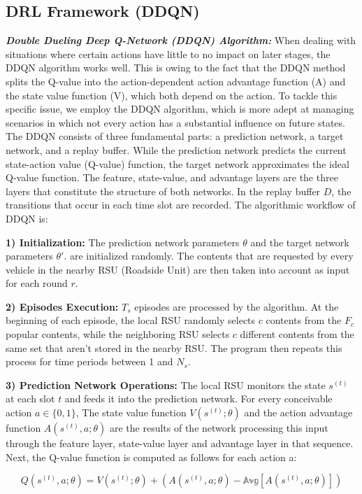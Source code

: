 \documentclass[journal]{IEEEtran}
\begin{document}
\subsection{DRL Framework (DDQN)}
\textbf{\textit{Double Dueling Deep Q-Network (DDQN) Algorithm:}}
When dealing with situations where certain actions have little to no impact on later stages, the DDQN algorithm works well. This is owing to the fact that the DDQN method splits the Q-value into the action-dependent action advantage function (A) and the state value function (V), which both depend on the action. To tackle this specific issue, we employ the DDQN algorithm, which is more adept at managing scenarios in which not every action has a substantial influence on future states. The DDQN consists of three fundamental parts: a prediction network, a target network, and a replay buffer. While the prediction network predicts the current state-action value (Q-value) function, the target network approximates the ideal Q-value function. The feature, state-value, and advantage layers are the three layers that constitute the structure of both networks. In the replay buffer $D$, the transitions that occur in each time slot are recorded.
The algorithmic workflow of DDQN is: 

\textbf{1) Initialization:}
The prediction network parameters $\theta$ and the target network parameters $\theta'$. are initialized randomly. The contents that are requested by every vehicle in the nearby RSU (Roadside Unit) are then taken into account as input for each round $r$. 

\textbf{2) Episodes Execution:} $T_s$ episodes are processed by the algorithm. At the beginning of each episode, the local RSU randomly selects $c$ contents from the $F_c$ popular contents, while the neighboring RSU selects $c$ different contents from the same set that aren't stored in the nearby RSU. The program then repeats this process for time periods between 1 and $N_s$. 

\textbf{3) Prediction Network Operations:} The local RSU monitors the state $s^{(t)}$ at each slot $t$ and feeds it into the prediction network. For every conceivable action $a \in \{0,1\}$, The state value function $V(s^{(t)};\theta)$ and the action advantage function $A(s^{(t)},a;\theta)$ are the results of the network processing this input through the feature layer, state-value layer and advantage layer in that sequence. Next, the Q-value function is computed as follows for each action a:

\begin{equation} \label{eq:14}
Q(s^{(t)},a;\theta) = V(s^{(t)};\theta) + \left( A(s^{(t)},a;\theta) - \mathbb{Avg}[A(s^{(t)},a;\theta)] \right)
\end{equation}
\end{document}
